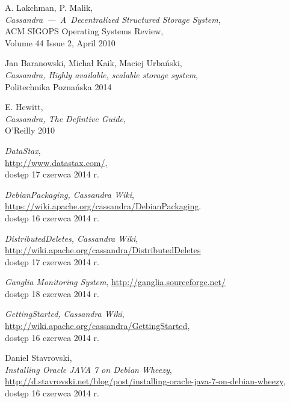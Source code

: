 \documentclass{article} %
\begin{document}
\begin{thebibliography}{10}%

A. Lakchman, P. Malik,\\
\emph{Cassandra~---~A~Decentralized Structured Storage System},\\
ACM SIGOPS Operating Systems Review,\\
Volume 44 Issue 2, April 2010

Jan Baranowski, Michał Kaik, Maciej Urbański,\\
\emph{Cassandra, Highly available, scalable storage system},\\
Politechnika Poznańska 2014

E. Hewitt,\\
\emph{Cassandra, The Defintive Guide},\\
O'Reilly 2010

\emph{DataStax},\\
\url{http://www.datastax.com/},\\
dostęp 17 czerwca 2014 r.

\emph{DebianPackaging, Cassandra Wiki},\\
\url{https://wiki.apache.org/cassandra/DebianPackaging}.\\
dostęp 16 czerwca 2014 r.

\emph{DistributedDeletes, Cassandra Wiki},\\
\url{http://wiki.apache.org/cassandra/DistributedDeletes}\\
dostęp 17 czerwca 2014 r.

\emph{Ganglia Monitoring System},
\url{http://ganglia.sourceforge.net/}\\
dostęp 18 czerwca 2014 r.

\emph{GettingStarted, Cassandra Wiki},\\
\url{http://wiki.apache.org/cassandra/GettingStarted},\\
dostęp 16 czerwca 2014 r.

Daniel Stavrovski,\\
\emph{Installing Oracle JAVA 7 on Debian Wheezy},\\
\url{http://d.stavrovski.net/blog/post/installing-oracle-java-7-on-debian-wheezy},\\
dostęp 16 czerwca 2014 r.


\end{thebibliography}
\end{document}
